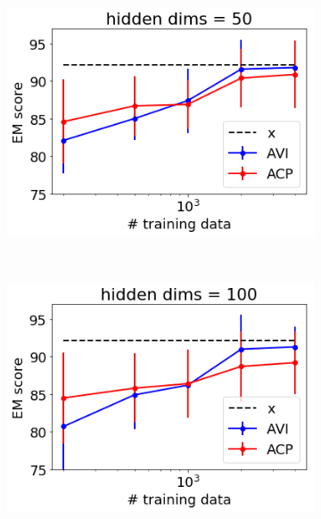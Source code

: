 \documentclass[twoside]{article}
\begin{document}
\begin{figure}
    \centering
    \begin{subfigure}[t]{0.33\textwidth}
        \centering
        \includegraphics[width=1.0\linewidth]{reuters_cl_h50.png}
        \caption{}
        \label{fig: reuters_h50}
    \end{subfigure}%
    ~\begin{subfigure}[t]{0.33\textwidth}
        \centering
        \includegraphics[width=1.0\linewidth]{reuters_cl_h100.png}
        \caption{}
        \label{fig: reuters_h100}
    \end{subfigure}%
    ~
    \begin{subfigure}[t]{0.33\textwidth}
        \centering

\end{subfigure}
\end{figure}
\end{document}
